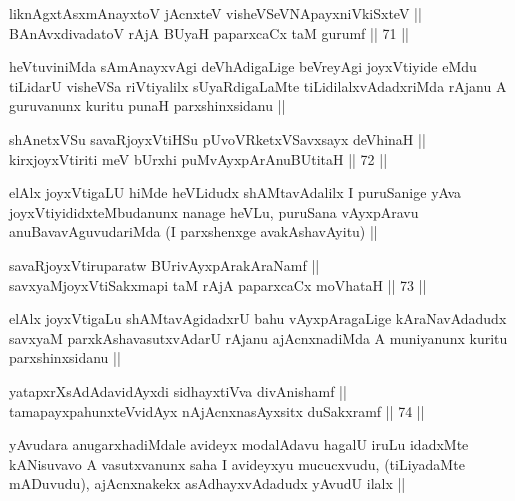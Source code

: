 \begin{shl}
liknAgxtAsxmAnayxtoV jAcnxteV visheVSeVNApayxniVkiSxteV || \\
BAnAvxdivadatoV rAjA BUyaH paparxcaCx taM gurumf ||  71 ||  
\end{shl}

\begin{artha}
heVtuviniMda sAmAnayxvAgi deVhAdigaLige beVreyAgi joyxVtiyide eMdu tiLidarU visheVSa riVtiyalilx sUyaRdigaLaMte tiLidilalxvAdadxriMda rAjanu A guruvanunx kuritu punaH parxshinxsidanu ||
\end{artha}

\begin{shl}
shAnetxVSu savaRjoyxVtiHSu pUvoVRketxVSavxsayx deVhinaH || \\
kirxjoyxVtiriti meV bUrxhi puMvAyxpArAnuBUtitaH ||  72 ||  
\end{shl}

\begin{artha}
elAlx joyxVtigaLU hiMde heVLidudx shAMtavAdalilx I puruSanige yAva joyxVtiyididxteMbudanunx nanage heVLu, puruSana vAyxpAravu anuBavavAguvudariMda (I parxshenxge avakAshavAyitu) ||
\end{artha}


\begin{shl}
savaRjoyxVtiruparatw BUrivAyxpArakAraNamf || \\
savxyaMjoyxVtiSakxmapi taM rAjA paparxcaCx moVhataH ||  73 ||  
\end{shl}

\begin{artha}
elAlx joyxVtigaLu shAMtavAgidadxrU bahu vAyxpAragaLige kAraNavAdadudx savxyaM parxkAshavasutxvAdarU rAjanu ajAcnxnadiMda A muniyanunx kuritu parxshinxsidanu ||
\end{artha}


\begin{shl}
yatapxrXsAdAdavidAyxdi sidhayxtiVva divAnishamf ||  \\
tamapayxpahunxteV\s vidAyx nAjAcnxnasAyxsitx duSakxramf ||  74 ||  
\end{shl}

\begin{artha}
yAvudara anugarxhadiMdale avideyx modalAdavu hagalU iruLu idadxMte kANisuvavo A vasutxvanunx saha I avideyxyu mucucxvudu, (tiLiyadaMte mADuvudu), ajAcnxnakekx asAdhayxvAdadudx yAvudU ilalx ||
\end{artha}

